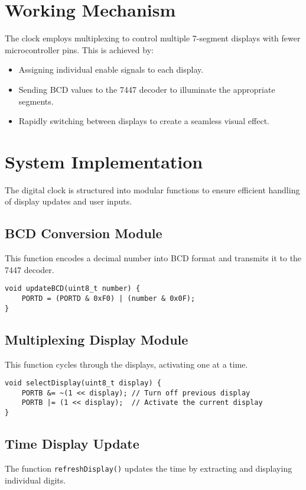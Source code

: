 \documentclass[journal]{IEEEtran}
\begin{document}
\section{Working Mechanism}
The clock employs multiplexing to control multiple 7-segment displays with fewer microcontroller pins. This is achieved by:
\begin{itemize}
    \item Assigning individual enable signals to each display.
    \item Sending BCD values to the 7447 decoder to illuminate the appropriate segments.
    \item Rapidly switching between displays to create a seamless visual effect.
\end{itemize}

\section{System Implementation}
The digital clock is structured into modular functions to ensure efficient handling of display updates and user inputs.

\subsection{BCD Conversion Module}
This function encodes a decimal number into BCD format and transmits it to the 7447 decoder.

\begin{lstlisting}[style=CStyle]
void updateBCD(uint8_t number) {
    PORTD = (PORTD & 0xF0) | (number & 0x0F);
}
\end{lstlisting}

\subsection{Multiplexing Display Module}
This function cycles through the displays, activating one at a time.

\begin{lstlisting}[style=CStyle]
void selectDisplay(uint8_t display) {
    PORTB &= ~(1 << display); // Turn off previous display
    PORTB |= (1 << display);  // Activate the current display
}
\end{lstlisting}

\subsection{Time Display Update}
The function \texttt{refreshDisplay()} updates the time by extracting and displaying individual digits.
\end{document}
